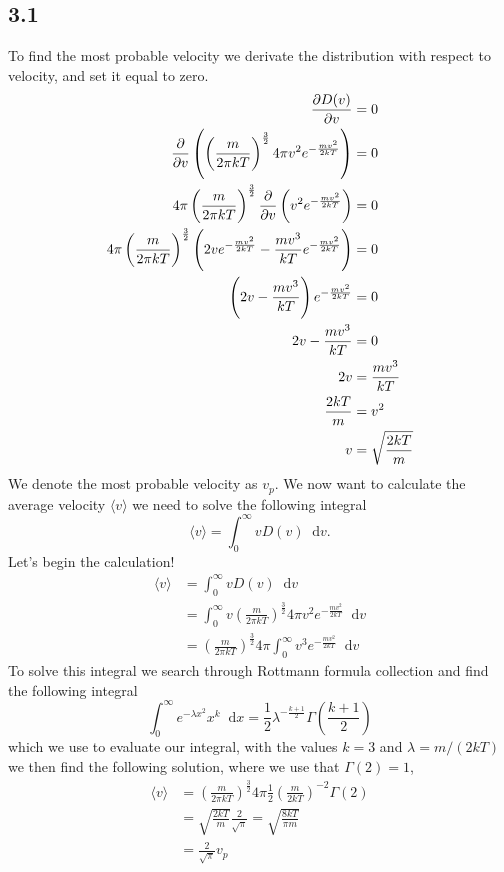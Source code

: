 \documentclass[a4paper,10pt, english]{article}
\newcommand*\diff{\mathop{}\!\mathrm{d}}
\begin{document}
\subsection*{3.1}
To find the most probable velocity we derivate the distribution with respect to velocity, and set it equal to zero.
\begin{align*}
    \pdv{D(v)}{v} &= 0 \\
    \pdv{}{v}\left(\left(\frac{m}{2\pi kT}\right)^{\frac{3}{2}}4\pi v^2e^{-\frac{mv^2}{2kT}}\right) &= 0 \\
    4\pi\left(\frac{m}{2\pi kT}\right)^{\frac{3}{2}}\pdv{}{v}\left(v^2e^{-\frac{mv^2}{2kT}}\right) &= 0 \\
    4\pi\left(\frac{m}{2\pi kT}\right)^{\frac{3}{2}} \left(2ve^{-\frac{mv^2}{2kT}}-\frac{mv^3}{kT}e^{-\frac{mv^2}{2kT}}\right) &= 0 \\
    \left(2v-\frac{mv^3}{kT}\right)e^{-\frac{mv^2}{2kT}} &= 0 \\
    2v-\frac{mv^3}{kT} &= 0 \\
    2v &= \frac{mv^3}{kT} \\
    \frac{2kT}{m} &= v^2 \\
    v &=  \sqrt{\frac{2kT}{m}}
\end{align*}
We denote the most probable velocity as $v_p$.
We now want to calculate the average velocity $\langle v \rangle $ we need to solve the following integral
\begin{equation}
    \langle v \rangle = \int_0^\infty vD(v)\diff v.
\end{equation}
Let's begin the calculation!
\begin{align*}
 \langle v \rangle &= \int_0^\infty vD(v)\diff v \\
 &= \int_0^\infty v \left(\frac{m}{2\pi kT}\right)^{\frac{3}{2}}4\pi v^2e^{-\frac{mv^2}{2kT}} \diff v \\
 &= \left(\frac{m}{2\pi kT}\right)^{\frac{3}{2}}4\pi \int_0^\infty  v^3e^{-\frac{mv^2}{2kT}} \diff v
\end{align*}
To solve this integral we search through Rottmann formula collection and find the following integral
\begin{equation}
    \int_0^\infty e^{-\lambda x^2}x^{k}\diff x = \frac{1}{2}\lambda^{-\frac{k+1}{2}}\Gamma\left(\frac{k+1}{2}\right)
\end{equation}
which we use to evaluate our integral, with the values $k=3$ and $\lambda = m/(2kT)$ we then find the following solution, where we use that $\Gamma(2) = 1$,
\begin{align*}
    \langle v \rangle &= \left(\frac{m}{2\pi kT}\right)^{\frac{3}{2}}4\pi\frac{1}{2}\left(\frac{m}{2kT}\right)^{-2}\Gamma\left(2\right) \\
    &= \sqrt{\frac{2kT}{m}}\frac{2}{\sqrt{\pi}} = \sqrt{\frac{8kT}{\pi m}} \\
    &= \frac{2}{\sqrt{\pi}}v_p
\end{align*}
\end{document}
